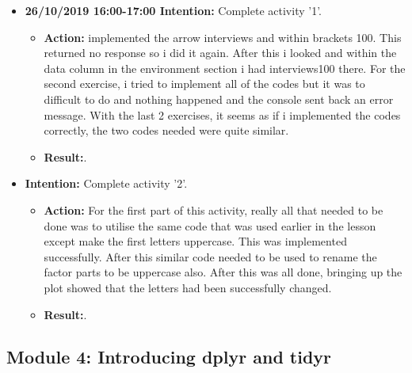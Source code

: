 \documentclass{article}
\begin{document}
\begin{itemize}
 
\item{\textbf{26/10/2019 16:00-17:00 Intention:} Complete activity '1'.}

\begin{itemize}
\item{\textbf{Action:} implemented the arrow interviews and within brackets 100. This returned no response so i did it again. After this i looked and within the data column in the environment section i had interviews100 there. For the second exercise, i tried to implement all of the codes but it was to difficult to do and nothing happened and the console sent back an error message. With the last 2 exercises, it seems as if i implemented the codes correctly, the two codes needed were quite similar.}
\item{\textbf{Result:}.}
\end{itemize}


\item{\textbf{Intention:} Complete activity '2'.}

\begin{itemize}
\item{\textbf{Action:} For the first part of this activity, really all that needed to be done was to utilise the same code that was used earlier in the lesson except make the first letters uppercase. This was implemented successfully. After this similar code needed to be used to rename the factor parts to be uppercase also. After this was all done, bringing up the plot showed that the letters had been successfully changed.}
\item{\textbf{Result:}.}
\end{itemize}


\end{itemize}




\subsection{Module 4: Introducing dplyr and tidyr}
\end{document}
